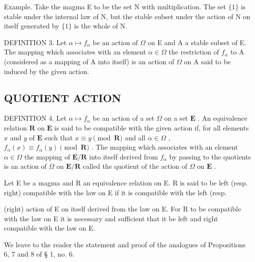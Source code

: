 Example. Take the magma E to be the set N with multiplication. The set \(\{1\}\) is stable under the internal law of N, but the stable subset under the action of N on itself generated by \(\{1\}\) is the whole of N.

DEFINITION 3. Let \(\alpha \mapsto f_{\alpha}\) be an action of \(\Omega\) on E and A a stable subset of E. The mapping which associates with an element \(\alpha \in \Omega\) the restriction of \(f_{\alpha}\) to A (considered as a mapping of A into itself) is an action of \(\Omega\) on A said to be induced by the given action.

\subsection{QUOTIENT ACTION}

DEFINITION 4. Let \(\alpha \mapsto f_{\alpha}\) be an action of a set \(\Omega\) on a set \(\mathbf{E}\) . An equivalence relation \(\mathbf{R}\) on \(\mathbf{E}\) is said to be compatible with the given action if, for all elements \(x\) and \(y\) of \(\mathbf{E}\) such that \(x \equiv y \pmod{\mathbf{R}}\) and all \(\alpha \in \Omega\) , \(f_{\alpha}(x) \equiv f_{\alpha}(y) \pmod{\mathbf{R}}\) . The mapping which associates with an element \(\alpha \in \Omega\) the mapping of \(\mathbf{E} / \mathbf{R}\) into itself derived from \(f_{\alpha}\) by passing to the quotients is an action of \(\Omega\) on \(\mathbf{E} / \mathbf{R}\) called the quotient of the action of \(\Omega\) on \(\mathbf{E}\) .

Let E be a magma and R an equivalence relation on E. R is said to be left (resp. right) compatible with the law on E if it is compatible with the left (resp.

(right) action of E on itself derived from the law on E. For R to be compatible with the law on E it is necessary and sufficient that it be left and right compatible with the law on E.

We leave to the reader the statement and proof of the analogues of Propositions 6, 7 and 8 of § 1, no. 6.
